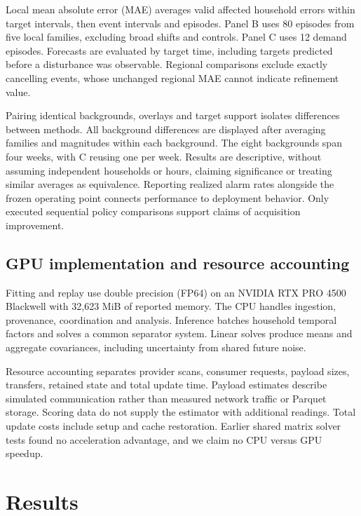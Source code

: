 \documentclass[conference]{IEEEtran}
\begin{document}
Local mean absolute error (MAE) averages valid affected household errors within target intervals, then event intervals and episodes. Panel B uses 80 episodes from five local families, excluding broad shifts and controls. Panel C uses 12 demand episodes. Forecasts are evaluated by target time, including targets predicted before a disturbance was observable. Regional comparisons exclude exactly cancelling events, whose unchanged regional MAE cannot indicate refinement value.

Pairing identical backgrounds, overlays and target support isolates differences between methods. All background differences are displayed after averaging families and magnitudes within each background. The eight backgrounds span four weeks, with C reusing one per week. Results are descriptive, without assuming independent households or hours, claiming significance or treating similar averages as equivalence. Reporting realized alarm rates alongside the frozen operating point connects performance to deployment behavior. Only executed sequential policy comparisons support claims of acquisition improvement.




\subsection{GPU implementation and resource accounting}
Fitting and replay use double precision (FP64) on an NVIDIA RTX PRO 4500 Blackwell with 32,623 MiB of reported memory. The CPU handles ingestion, provenance, coordination and analysis. Inference batches household temporal factors and solves a common separator system. Linear solves produce means and aggregate covariances, including uncertainty from shared future noise.

Resource accounting separates provider scans, consumer requests, payload sizes, transfers, retained state and total update time. Payload estimates describe simulated communication rather than measured network traffic or Parquet storage. Scoring data do not supply the estimator with additional readings. Total update costs include setup and cache restoration. Earlier shared matrix solver tests found no acceleration advantage, and we claim no CPU versus GPU speedup.









\section{Results}
\end{document}
